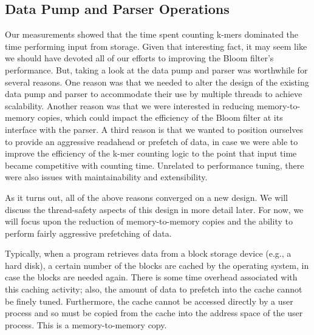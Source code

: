 \documentclass{article}
\begin{document}
\subsection{Data Pump and Parser Operations}

Our measurements showed that the time spent counting k-mers dominated the time
performing input from storage. Given that interesting fact, it may seem like we
should have devoted all of our efforts to improving the Bloom filter's
performance. But, taking a look at the data pump and parser was worthwhile for
several reasons. One reason was that we needed to alter the design of the
existing data pump and parser to accommodate their use by multiple threads to
achieve scalability. Another reason was that we were interested in reducing
memory-to-memory copies, which could impact the efficiency of the Bloom filter
at its interface with the parser. A third reason is that we wanted to position
ourselves to provide an aggressive readahead or prefetch of data, in case we
were able to improve the efficiency of the k-mer counting logic to the point
that input time became competitive with counting time. Unrelated to performance
tuning, there were also issues with maintainability and extensibility.

As it turns out, all of the above reasons converged on a new design. We will
discuss the thread-safety aspects of this design in more detail later. For now,
we will focus upon the reduction of memory-to-memory copies and the ability to
perform fairly aggressive prefetching of data.

Typically, when a program retrieves data from a block storage device (e.g., a
hard disk), a certain number of the blocks are cached by the operating system,
in case the blocks are needed again. There is some time overhead associated
with this caching activity; also, the amount of data to prefetch into the cache
cannot be finely tuned. Furthermore, the cache cannot be accessed directly by a
user process and so must be copied from the cache into the address space of the
user process.  This is a memory-to-memory copy. 
\end{document}
